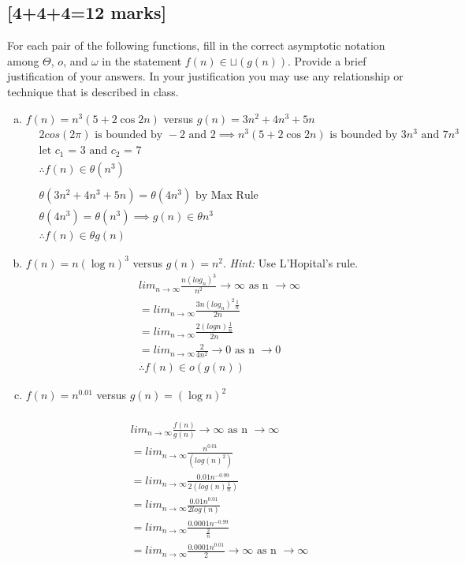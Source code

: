 \documentclass[12pt]{article}
\begin{document}
\subsection{[4+4+4=12 marks]}
For each pair of the following functions, fill in the correct asymptotic
notation among $\Theta$, $o$, and $\omega$ in the statement $f(n)\in
\sqcup(g(n))$.  Provide a brief justification of your answers.  In your
justification you may use any relationship or technique that is described
in class.
\begin{enumerate}[(a)]
\item $f(n) = n^3(5+2\cos{2n})$ versus $g(n)=3n^2+4n^3+5n$\\
\begin{align*}
  &2cos(2\pi) \text{ is bounded by } -2 \text{ and } 2 \implies n^3(5+2\cos{2n}) \text{ is bounded by }3n^3 \text { and } 7n^3\\
  &\text{let $c_1$ = 3 and $c_2$ = 7}\\
  &\therefore f(n) \in \theta(n^3)\\
  \\
  &\theta(3n^2 + 4n^3 + 5n) = \theta(4n^3) \text{ by Max Rule }\\
  &\theta(4n^3) = \theta(n^3) \implies g(n) \in \theta{n^3}\\
  &\therefore f(n) \in \theta g(n)
\end{align*}
\item $f(n) = n (\log n)^{3}$ versus $g(n) = n^{2}$. \emph{Hint:} Use L'Hopital's rule.\\
\begin{align*}
  &lim_{n \rightarrow \infty} \frac{n(log_n)^3}{n^2} \rightarrow \infty \text{ as n } \rightarrow \infty\\
  &= lim_{n \rightarrow \infty} \frac{3n(log_n)^2\frac{1}{n}}{2n}\\
  &= lim_{n \rightarrow \infty} \frac{2(logn)\frac{1}{n}}{2n}\\
  &= lim_{n \rightarrow \infty} \frac{2}{4n^2} \rightarrow 0 \text{ as n } \rightarrow 0\\
  &\therefore f(n) \in o(g(n))
\end{align*}
\item $f(n) = n^{0.01}$ versus $g(n) = (\log n)^{2}$\\
\\
\begin{align*}
  &lim_{n \rightarrow \infty} \frac{f(n)}{g(n)} \rightarrow \infty \text{ as n } \rightarrow \infty\\
  &= lim_{n \rightarrow \infty} \frac{n^{0.01}}{(log(n)^2)}\\
  &= lim_{n \rightarrow \infty} \frac{0.01n^{-0.99}}{2(log(n)\frac{1}{n})}\\
  &= lim_{n \rightarrow \infty} \frac{0.01n^{0.01}}{2log(n)}\\
  &= lim_{n \rightarrow \infty} \frac{0.0001n^{-0.99}}{\frac{2}{n}}\\
  &= lim_{n \rightarrow \infty} \frac{0.0001n^{0.01}}{2} \rightarrow \infty \text{  as n } \rightarrow \infty\\
\end{align*}
\end{enumerate}
\newpage
\end{document}
